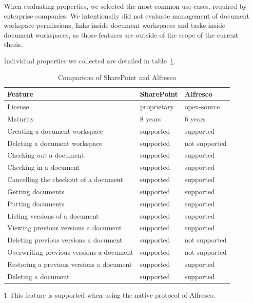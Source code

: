 When evaluating properties, we selected the most common use-cases, required by
enterprise companies. We intentionally did not evaluate management of document
workspace permissions, links inside document workspaces and tasks inside
document workspaces, as those features are outside of the scope of the current
thesis.

Individual properties we collected are detailed in
table~\ref{tab:background-comparison}.

\begin{table}[H]
\begin{threeparttable}
  \begin{center}
    \begin{tabular}{| l | l | l |}
    \hline
    \textbf{Feature} & \textbf{SharePoint} & \textbf{Alfresco} \\ \hline
    License & proprietary & open-source \\ \hline
    Maturity & 8 years\cite{sphist} & 6 years \\ \hline
    Creating a document workspace & supported & supported \\ \hline
    Deleting a document workspace & supported & not supported\tnote{1}\\ \hline
    Checking out a document & supported & supported \\ \hline
    Checking in a document & supported & supported \\ \hline
    Cancelling the checkout of a document & supported & supported \\ \hline
    Getting documents & supported & supported \\ \hline
    Putting documents & supported & supported \\ \hline
    Listing versions of a document & supported & supported \\ \hline
    Viewing previous versions a document & supported & supported \\ \hline
    Deleting previous versions a document & supported & not supported \\ \hline
    Overwriting previous versions a document & supported & not supported \\ \hline
    Restoring a previous versions a document & supported & supported \\ \hline
    Deleting a document & supported & supported \\ \hline
    \end{tabular}
    \begin{tablenotes}
    \item [1] This feature is supported when using the native protocol of Alfresco.
    \end{tablenotes}
  \end{center}
  \caption{Comparison of SharePoint and Alfresco}
  \label{tab:background-comparison}
\end{threeparttable}
\end{table}

